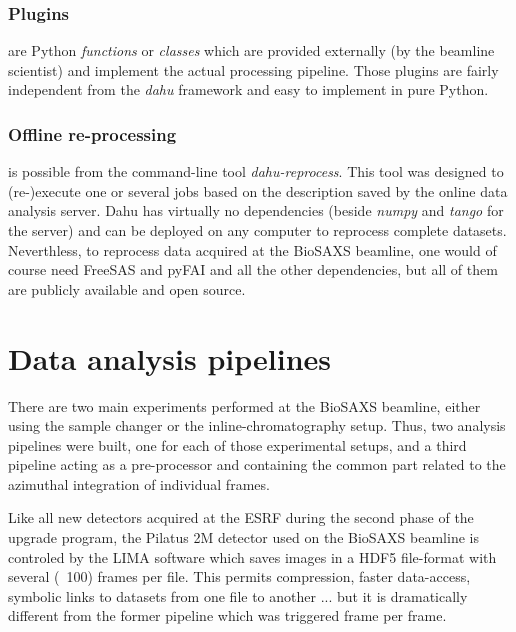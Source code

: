 \documentclass[preprint]{iucr}              %
\begin{document}
\subsubsection{Plugins}
are Python \textit{functions} or \textit{classes} which are provided externally (by the beamline scientist) and implement the actual processing pipeline.
Those plugins are fairly independent from the \textit{dahu} framework and easy to implement in pure Python.


\subsubsection{Offline re-processing}
is possible from the command-line tool \textit{dahu-reprocess}.
This tool was designed to (re-)execute one or several jobs based on the description saved by the online data analysis server. 
Dahu has virtually no dependencies (beside \textit{numpy} and \textit{tango} for the server) and can be deployed on any computer to reprocess complete datasets. 
Neverthless, to reprocess data acquired at the BioSAXS beamline, one would of course need FreeSAS and pyFAI and all the other dependencies, but all of them are publicly available and open source.

\section{Data analysis pipelines}

There are two main experiments performed at the BioSAXS beamline, either using the sample changer or the inline-chromatography setup.
Thus, two analysis pipelines were built, one for each of those experimental setups, and a third pipeline acting as a pre-processor and containing the common part related to the azimuthal integration of individual frames.

Like all new detectors acquired at the ESRF during the second phase of the upgrade program, the Pilatus 2M detector used on the BioSAXS beamline is controled by the LIMA \cite{lima} software which saves images in a HDF5 file-format \cite{hdf5} with several (~100) frames per file.
This permits compression, faster data-access, symbolic links to datasets from one file to another ... but it is dramatically different from the former pipeline which was triggered frame per frame.
\end{document}
